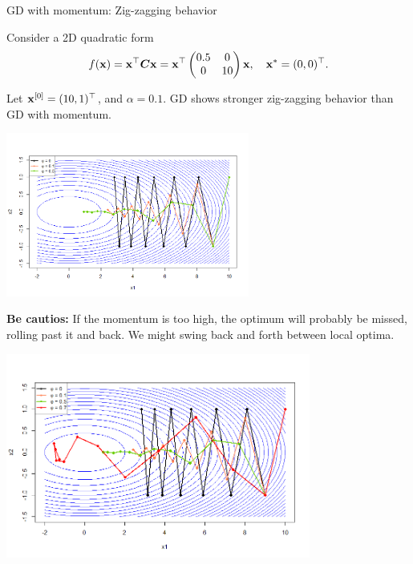 \documentclass[11pt,compress,t,notes=noshow, xcolor=table]{beamer}
\begin{document}
\begin{vbframe}{GD with momentum: Zig-zagging behavior}

Consider a 2D quadratic form 
$$
	f(\mathbf{x}) = \mathbf{x}^\top \bm{C} \mathbf{x} = \mathbf{x}^\top \begin{pmatrix} 0.5 & 0  \\ 0 & 10 \end{pmatrix} \mathbf{x}, \quad \mathbf{x}^\ast = (0, 0)^\top. 
$$ 

Let $\mathbf{x}^{[0]} = (10, 1)^\top$, and $\alpha = 0.1$. GD shows stronger zig-zagging behavior than GD with momentum. 
\vspace*{-0.2cm}

\begin{center}
\includegraphics[width = 0.6\textwidth]{figure_man/momentum/compare_gd_momentum.png}
\end{center}

\framebreak
\textbf{Be cautios:} If the momentum is too high, the optimum will probably be missed, rolling past it and back. We might swing back and forth between local optima.
\begin{center}
\includegraphics[width = 0.75\textwidth]{figure_man/momentum/comparison_momentum_overshoot.png}
\end{center}

\end{vbframe}
\end{document}
